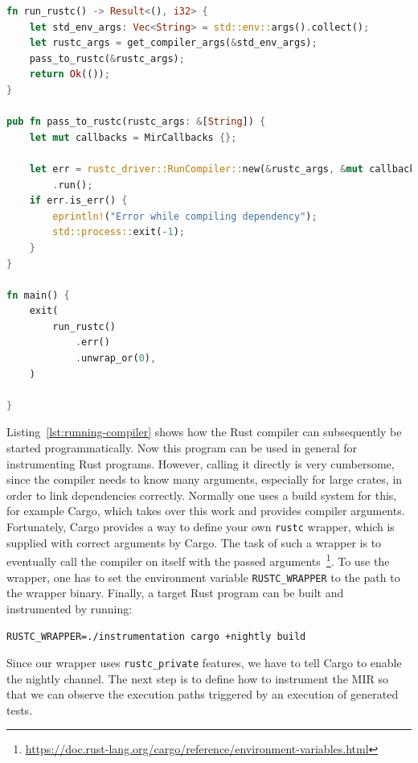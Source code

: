 \documentclass{article}
\begin{document}
\begin{lstlisting}[language=Rust, style=boxed, caption={Running the Rust compiler like a library}, label=lst:running-compiler]
fn run_rustc() -> Result<(), i32> {
    let std_env_args: Vec<String> = std::env::args().collect();
    let rustc_args = get_compiler_args(&std_env_args);
    pass_to_rustc(&rustc_args);
    return Ok(());
}

pub fn pass_to_rustc(rustc_args: &[String]) {
    let mut callbacks = MirCallbacks {};

    let err = rustc_driver::RunCompiler::new(&rustc_args, &mut callbacks)
        .run();
    if err.is_err() {
        eprintln!("Error while compiling dependency");
        std::process::exit(-1);
    }
}

fn main() {
    exit(
        run_rustc()
            .err()
            .unwrap_or(0),
    )

}
\end{lstlisting}

Listing~\ref{lst:running-compiler} shows how the Rust compiler can subsequently be started programmatically. Now this program can be used in general for instrumenting Rust programs. However, calling it directly is very cumbersome, since the compiler needs to know many arguments, especially for large crates, in order to link dependencies correctly. Normally one uses a build system for this, for example Cargo, which takes over this work and provides compiler arguments. Fortunately, Cargo provides a way to define your own \lstinline{rustc} wrapper, which is supplied with correct arguments by Cargo. The task of such a wrapper is to eventually call the compiler on itself with the passed arguments~\footnote{\url{https://doc.rust-lang.org/cargo/reference/environment-variables.html}}. To use the wrapper, one has to set the environment variable \lstinline{RUSTC_WRAPPER} to the path to the wrapper binary. Finally, a target Rust program can be built and instrumented by running:

\lstinline{RUSTC_WRAPPER=./instrumentation cargo +nightly build}

Since our wrapper uses \lstinline{rustc_private} features, we have to tell Cargo to enable the nightly channel. The next step is to define how to instrument the \ac{MIR} so that we can observe the execution paths triggered by an execution of generated tests.


\end{document}
